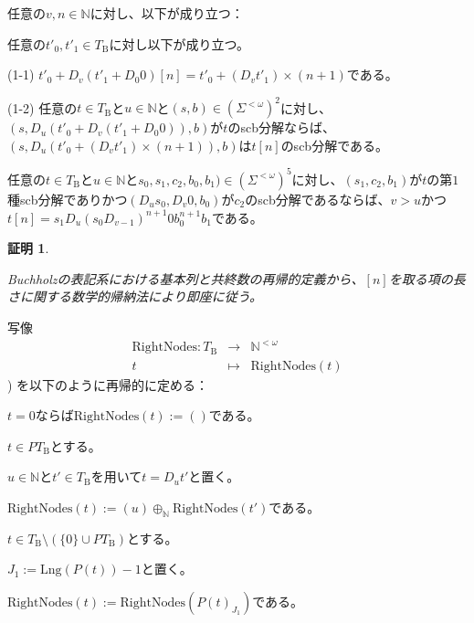 \documentclass[dvipdfmx,uplatex]{jsarticle}
\theoremstyle{customnonumberbreakfortheorem}
\theoremstyle{customnonumberbreakforproof}
\newtheorem{hideableproof}{証明}
\begin{document}
\begin{proposition}[scb分解と基本列の関係]\label{scb分解と基本列の関係}
	任意の\(v,n \in \mathbb{N}\)に対し、以下が成り立つ：
	\begin{penumerate}
		\item 任意の\(t'_0,t'_1 \in T_{\textrm{B}}\)に対し以下が成り立つ。
		\begin{indented}
			\item[(1-1)] \(t'_0 + D_v(t'_1 + D_0 0)[n] = t'_0 + (D_v t'_1) \times (n+1)\)である。
			\item[(1-2)] 任意の\(t \in T_{\textrm{B}}\)と\(u \in \mathbb{N}\)と\((s,b) \in (\Sigma^{< \omega})^2\)に対し、\((s,D_u(t'_0 + D_v(t'_1+D_0 0)),b)\)が\(t\)のscb分解ならば、\((s,D_u(t'_0 + (D_v t'_1) \times (n+1)),b)\)は\(t[n]\)のscb分解である。
		\end{indented}
		\item 任意の\(t \in T_{\textrm{B}}\)と\(u \in \mathbb{N}\)と\(s_0,s_1,c_2,b_0,b_1) \in (\Sigma^{< \omega})^5\)に対し、\((s_1,c_2,b_1)\)が\(t\)の第\(1\)種scb分解でありかつ\((D_u s_0,D_v 0,b_0)\)が\(c_2\)のscb分解であるならば、\(v > u\)かつ\(t[n] = s_1 D_u (s_0 D_{v-1})^{n+1} 0 b_0^{n+1}b_1\)である。
	\end{penumerate}
\end{proposition}

\begin{hideableproof}
	\begin{indented}
		\item Buchholzの表記系における基本列と共終数の再帰的定義から、\([n]\)を取る項の長さに関する数学的帰納法により即座に従う。
	\end{indented}
\end{hideableproof}

写像
\begin{eqnarray*}
\textrm{RightNodes} \colon T_{\textrm{B}} & \to & \mathbb{N}^{< \omega} \\
t & \mapsto & \textrm{RightNodes}(t)
\end{eqnarray*})
を以下のように再帰的に定める：
\begin{nenumerate}
	\item \(t = 0\)ならば\(\textrm{RightNodes}(t) := ()\)である。
	\item \(t \in PT_{\textrm{B}}\)とする。
	\begin{nenumerate}
		\item \(u \in \mathbb{N}\)と\(t' \in T_{\textrm{B}}\)を用いて\(t = D_u t'\)と置く。
		\item \(\textrm{RightNodes}(t) := (u) \oplus_{\mathbb{N}} \textrm{RightNodes}(t')\)である。
	\end{nenumerate}
	\item \(t \in T_{\textrm{B}} \setminus (\{0\} \cup PT_{\textrm{B}})\)とする。
	\begin{nenumerate}
		\item \(J_1 := \textrm{Lng}(P(t)) - 1\)と置く。
		\item \(\textrm{RightNodes}(t) := \textrm{RightNodes}(P(t)_{J_1})\)である。
	\end{nenumerate}
\end{nenumerate}
\end{document}
